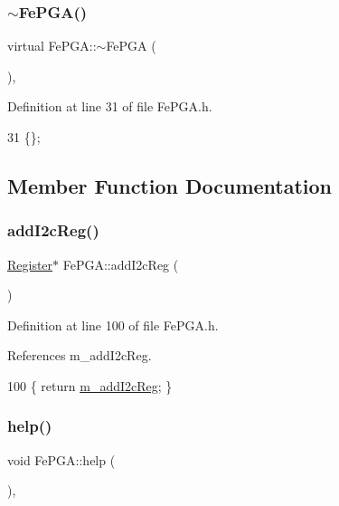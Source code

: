 \subsubsection{\texorpdfstring{$\sim$\+Fe\+P\+G\+A()}{~FePGA()}}
{\footnotesize\ttfamily virtual Fe\+P\+G\+A\+::$\sim$\+Fe\+P\+GA (\begin{DoxyParamCaption}{ }\end{DoxyParamCaption})\hspace{0.3cm}{\ttfamily [inline]}, {\ttfamily [virtual]}}



Definition at line 31 of file Fe\+P\+G\+A.\+h.


\begin{DoxyCode}
31 \{\}; 
\end{DoxyCode}


\subsection{Member Function Documentation}
\mbox{\label{classFePGA_a64feabdb09e65b1b4b1376a4da713570}} 
\subsubsection{\texorpdfstring{add\+I2c\+Reg()}{addI2cReg()}}
{\footnotesize\ttfamily \hyperlink{classRegister}{Register}$\ast$ Fe\+P\+G\+A\+::add\+I2c\+Reg (\begin{DoxyParamCaption}{ }\end{DoxyParamCaption})\hspace{0.3cm}{\ttfamily [inline]}}



Definition at line 100 of file Fe\+P\+G\+A.\+h.



References m\+\_\+add\+I2c\+Reg.


\begin{DoxyCode}
100 \{ \textcolor{keywordflow}{return} \hyperlink{classFePGA_af3ef3467ba803e6d3b970ea8982d6246}{m\_addI2cReg};    \}
\end{DoxyCode}
\mbox{\label{classFePGA_ae6425fbad1a8db57025efaf387a6f41b}} 
\subsubsection{\texorpdfstring{help()}{help()}}
{\footnotesize\ttfamily void Fe\+P\+G\+A\+::help (\begin{DoxyParamCaption}{ }\end{DoxyParamCaption})\hspace{0.3cm}{\ttfamily [inline]}, {\ttfamily [virtual]}}



